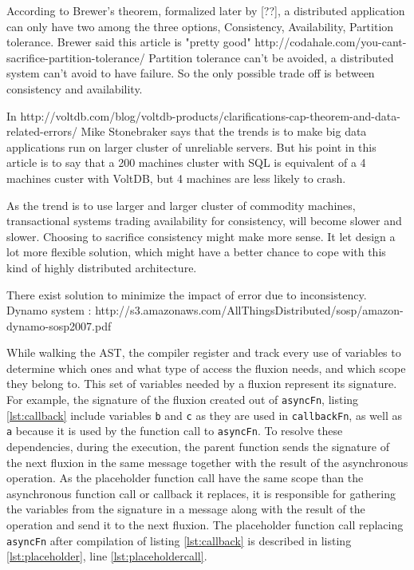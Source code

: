 According to Brewer's theorem, formalized later by [??], a distributed application can only have two among the three options, Consistency, Availability, Partition tolerance.
Brewer said this article is "pretty good" http://codahale.com/you-cant-sacrifice-partition-tolerance/
Partition tolerance can't be avoided, a distributed system can't avoid to have failure.
So the only possible trade off is between consistency and availability.

In http://voltdb.com/blog/voltdb-products/clarifications-cap-theorem-and-data-related-errors/ Mike Stonebraker says that the trends is to make big data applications run on larger cluster of unreliable servers.
But his point in this article is to say that a 200 machines cluster with SQL is equivalent of a 4 machines custer with VoltDB, but 4 machines are less likely to crash.

As the trend is to use larger and larger cluster of commodity machines, transactional systems trading availability for consistency, will become slower and slower.
Choosing to sacrifice consistency might make more sense.
It let design a lot more flexible solution, which might have a better chance to cope with this kind of highly distributed architecture.

There exist solution to minimize the impact of error due to inconsistency.
Dynamo system : http://s3.amazonaws.com/AllThingsDistributed/sosp/amazon-dynamo-sosp2007.pdf




While walking the AST, the compiler register and track every use of variables to determine which ones and what type of access the fluxion needs, and which scope they belong to.
This set of variables needed by a fluxion represent its signature.
For example, the signature of the fluxion created out of \texttt{asyncFn}, listing \ref{lst:callback} include variables \texttt{b} and \texttt{c} as they are used in \texttt{callbackFn}, as well as \texttt{a} because it is used by the function call to \texttt{asyncFn}.
To resolve these dependencies, during the execution, the parent function sends the signature of the next fluxion in the same message together with the result of the asynchronous operation.
As the placeholder function call have the same scope than the asynchronous function call or callback it replaces, it is responsible for gathering the variables from the signature in a message along with the result of the operation and send it to the next fluxion.
The placeholder function call replacing \texttt{asyncFn} after compilation of listing \ref{lst:callback} is described in listing \ref{lst:placeholder}, line \ref{lst:placeholdercall}.

